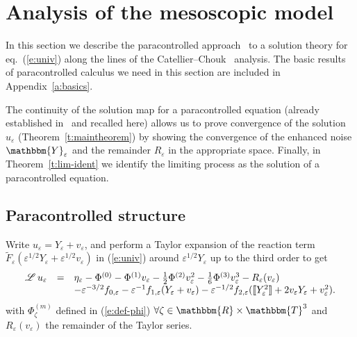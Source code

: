 \documentclass[a4paper,11pt]{article}
\newcommand{\LL}{\mathscr{L} \hspace{.2em}}
\begin{document}
\section{\label{s:universal-analytic}Analysis of the mesoscopic model}

In this section we describe the paracontrolled
approach~{\cite{gubinelli_paracontrolled_2012}} to a solution theory for
eq.~(\ref{e:univ}) along the lines of the
Catellier--Chouk~{\cite{catellier_paracontrolled_2013}} analysis. The basic
results of paracontrolled calculus we need in this section are included in
Appendix~\ref{a:basics}.

The continuity of the solution map for a paracontrolled equation (already
established in~{\cite{catellier_paracontrolled_2013}} and recalled here)
allows us to prove convergence of the solution $u_{\varepsilon}$
(Theorem~\ref{t:maintheorem}) by showing the convergence of the enhanced noise
$\mathbbm{Y}_{\varepsilon}$ and the remainder $R_{\varepsilon}$ in the
appropriate space. Finally, in Theorem~\ref{t:lim-ident} we identify the
limiting process as the solution of a paracontrolled equation.

\subsection{Paracontrolled structure}

Write $u_{\varepsilon} = Y_{\varepsilon} + v_{\varepsilon}$, and perform a
Taylor expansion of the reaction term $\tilde{F}_{\varepsilon} (\varepsilon^{1
/ 2} Y_{\varepsilon} + \varepsilon^{1 / 2} v_{\varepsilon})$ in (\ref{e:univ})
around $\varepsilon^{1 / 2} Y_{\varepsilon}$ up to the third order to get
\begin{equation}
  \begin{array}{lll}
    \LL u_{\varepsilon} & = & \eta_{\varepsilon} - \Phi^{(0)} - \Phi^{(1)}
    v_{\varepsilon} - \frac{1}{2} \Phi^{(2)} v_{\varepsilon}^2 - \frac{1}{6}
    \Phi^{(3)} v_{\varepsilon}^3 - R_{\varepsilon} (v_{\varepsilon})\\
    &  & - \varepsilon^{- 3 / 2} f_{0, \varepsilon} - \varepsilon^{- 1} f_{1,
    \varepsilon} (Y_{\varepsilon} + v_{\varepsilon}) - \varepsilon^{- 1 / 2}
    f_{2, \varepsilon} (\llbracket Y_{\varepsilon}^2 \rrbracket + 2
    v_{\varepsilon} Y_{\varepsilon} + v_{\varepsilon}^2) .
  \end{array} \label{eq:first-exp}
\end{equation}
with $\Phi_{\zeta}^{(m)}$ defined in (\ref{e:def-phi}) $\forall \zeta \in
\mathbbm{R} \times \mathbbm{T}^3$ and $R_{\varepsilon} (v_{\varepsilon})$ the
remainder of the Taylor series.
\end{document}
